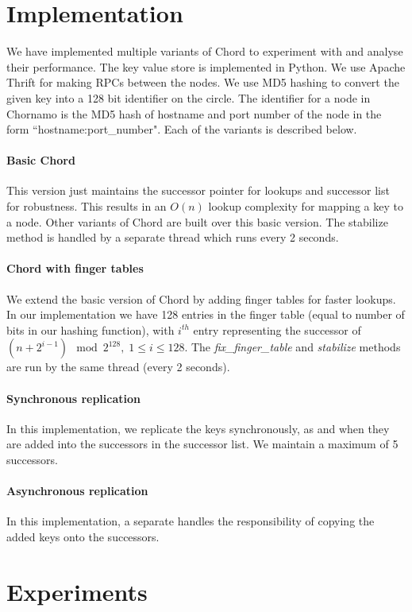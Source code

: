 \documentclass{sig-alternate-10pt}
\begin{document}
\section{Implementation}
We have implemented multiple variants of Chord to experiment with and analyse their performance. The key value store is implemented in Python. We use Apache Thrift \cite{thrift} for making RPCs between the nodes. We use MD5 hashing to convert the given key into a 128 bit identifier on the circle. The identifier for a node in Chornamo is the MD5 hash of hostname and port number of the node in the form ``hostname:port\_number". 
Each of the variants is described below.
\paragraph{Basic Chord}
This version just maintains the successor pointer for lookups and successor list for robustness. This results in an $O(n)$ lookup complexity for mapping a key to a node. Other variants of Chord are built over this basic version. The stabilize method is handled by a separate thread which runs every 2 seconds.

\paragraph{Chord with finger tables}
We extend the basic version of Chord by adding finger tables for faster lookups. In our implementation we have 128 entries in the finger table (equal to number of bits in our hashing function), with $i^{th}$ entry representing the successor of $(n + 2^{i - 1}) \mod 2^{128},\; 1 \leq i \leq 128$. The \textit{fix\_finger\_table} and \textit{stabilize} methods are run by the same thread (every 2 seconds).

\paragraph{Synchronous replication}
In this implementation, we replicate the keys synchronously, as and when they are added into the successors in the successor list. We maintain a maximum of 5 successors.

\paragraph{Asynchronous replication}
In this implementation, a separate handles the responsibility of copying the added keys onto the successors.

\section{Experiments}
\end{document}
